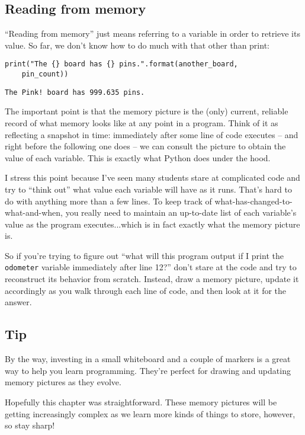 \subsection{Reading from memory}

``Reading from memory'' just means referring to a variable in order to retrieve
its value. So far, we don't know how to do much with that other than print:

\begin{Verbatim}[fontsize=\small,samepage=true,frame=single,framesep=3mm]
print("The {} board has {} pins.".format(another_board,
    pin_count))
\end{Verbatim}

\begin{Verbatim}[fontsize=\small,samepage=true,frame=leftline,framesep=5mm,framerule=1mm]
The Pink! board has 999.635 pins.
\end{Verbatim}

The important point is that the memory picture is the (only) current, reliable
record of what memory looks like at any point in a program. Think of it as
reflecting a snapshot in time: immediately after some line of code executes --
and right before the following one does -- we can consult the picture to obtain
the value of each variable. This is exactly what Python does under the hood.

I stress this point because I've seen many students stare at complicated code
and try to ``think out'' what value each variable will have as it runs. That's
hard to do with anything more than a few lines. To keep track of
what-has-changed-to-what-and-when, you really need to maintain an up-to-date
list of each variable's value as the program executes...which is in fact
exactly what the memory picture is.

So if you're trying to figure out ``what will this program output if I print
the \texttt{odometer} variable immediately after line 12?'' don't stare at the
code and try to reconstruct its behavior from scratch. Instead, draw a memory
picture, update it accordingly as you walk through each line of code, and then
look at it for the answer.

\subsection{Tip}

By the way, investing in a small whiteboard and a couple of markers is a great
way to help you learn programming. They're perfect for drawing and updating
memory pictures as they evolve.

Hopefully this chapter was straightforward. These memory pictures will be
getting increasingly complex as we learn more kinds of things to store,
however, so stay sharp!
